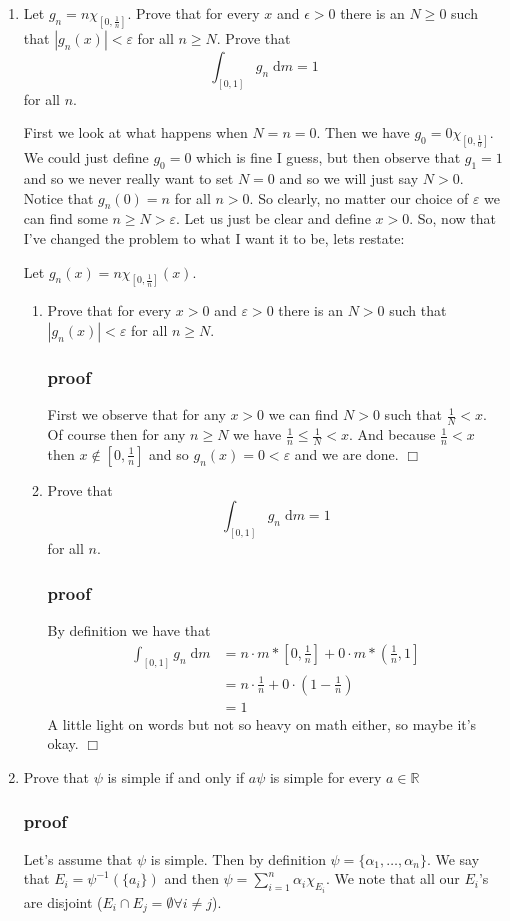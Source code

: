 \documentclass[letterpaper]{article}
\begin{document}
\begin{enumerate}
\item
Let $g_n=n\chi_{[0,\frac{1}{n}]}$. Prove that for every $x$ and $\epsilon>0$ there is an $N\ge 0$ such that $|g_n(x)|<\varepsilon$ for all $n\ge N$. Prove that
\[\int_{[0,1]}{g_n\;\mathrm{d}m}=1\]
for all $n$.

First we look at what happens when $N=n=0$. Then we have $g_0=0\chi_{[0,\frac{1}{0}]}$. We could just define $g_0=0$ which is fine I guess, but then observe that $g_1=1$ and so we never really want to set $N=0$ and so we will just say $N>0$. Notice that $g_n(0)=n$ for all $n>0$. So clearly, no matter our choice of $\varepsilon$ we can find some $n\ge N>\varepsilon$. Let us just be clear and define $x>0$. So, now that I've changed the problem to what I want it to be, lets restate:

Let $g_n(x)=n\chi_{[0,\frac{1}{n}]}(x)$.
\begin{enumerate}
\item
Prove that for every $x>0$ and $\varepsilon>0$ there is an $N> 0$ such that $|g_n(x)|<\varepsilon$ for all $n\ge N$.
\subsubsection*{proof}
First we observe that for any $x>0$ we can find $N>0$ such that $\frac{1}{N}<x$. Of course then for any $n\ge N$ we have $\frac{1}{n}\le \frac{1}{N}<x$. And because $\frac{1}{n}<x$ then $x\not\in [0,\frac{1}{n}]$ and so $g_n(x)=0<\varepsilon$ and we are done. $\Box$
\item
Prove that
\[\int_{[0,1]}{g_n\;\mathrm{d}m}=1\]
for all $n$.
\subsubsection*{proof}
By definition we have that
\begin{align*}
\int_{[0,1]}{g_n\;\mathrm{d}m}&=n\cdot m*\left[0,\frac{1}{n}\right]+0\cdot m*\left(\frac{1}{n},1\right]\\
&=n\cdot \frac{1}{n}+0\cdot\left(1-\frac{1}{n}\right)\\
&=1
\end{align*}
A little light on words but not so heavy on math either, so maybe it's okay. $\Box$
\end{enumerate}
\item
Prove that $\psi$ is simple if and only if $a\psi$ is simple for every $a\in \mathbb{R}$
\subsubsection*{proof}
Let's assume that $\psi$ is simple. Then by definition
$\psi=\{\alpha_1,\dots,\alpha_n\}$.
We say that $E_i=\psi^{-1}(\{a_i\})$
and then $\psi=\sum\limits_{i=1}^n{\alpha_i\chi_{E_i}}$.
We note that all our $E_i$'s are disjoint ($E_i\cap E_j=\emptyset\forall i\ne j$). 


\end{enumerate}
\end{document}
